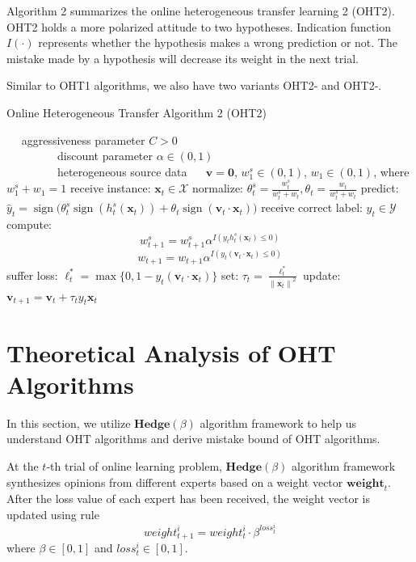 \documentclass{article} %
\theoremstyle{remark}
\theoremstyle{definition}
\DeclareMathOperator{\sign}{sign}
\begin{document}
Algorithm 2 summarizes the online heterogeneous transfer learning 2 (OHT2).
OHT2 holds a more polarized attitude to two hypotheses.
Indication function $I(\cdot)$ represents whether the hypothesis makes a wrong prediction or not.
The mistake made by a hypothesis will decrease its weight in the next trial.

Similar to OHT1 algorithms, we also have two variants OHT2-\uppercase\expandafter{} and OHT2-\uppercase\expandafter{}.

\begin{algorithm}
\begin{algorithmic}[1]
\caption{Online Heterogeneous Transfer Algorithm 2 (OHT2)}
\REQUIRE ~~
aggressiveness parameter $C>0$\\ 
~~~~~~~~~discount parameter $\alpha \in (0,1)$\\ 
~~~~~~~~~heterogeneous source data 
\ENSURE ~~
$\mathbf{v} = \mathbf{0}$, $w_{1}^{s} \in (0,1)$, $w_{1} \in (0,1)$, where $w_{1}^{s} + w_1 = 1$
\STATE 
  receive instance: $\mathbf{x}_t \in \mathcal{X}$
\STATE
  normalize: $\theta_{t}^{s} = \frac{w_{t}^{s}}{w_{t}^{s}+w_t}, \theta_{t} = \frac{w_{t}}{w_{t}^{s}+w_t}$
\STATE
  predict: $\hat{y}_t = \sign \big( \theta_{t}^{s} \sign (h_{t}^{s}(\mathbf{x}_t)) + \theta_{t} \sign (\mathbf{v}_t \cdot \mathbf{x}_t) \big)$
\STATE
  receive correct label: $y_t \in \mathcal{Y}$
\STATE
  compute: 
    $$w_{t+1}^{s} = w_{t+1}^{s} \alpha ^ {I(y_t h_{t}^{s}(\mathbf{x}_t) \leq 0)}  $$
    $$w_{t+1} = w_{t+1} \alpha ^ {I(y_t (\mathbf{v}_t \cdot \mathbf{x}_t) \leq 0)}  $$
\STATE
  suffer loss: $\ell_{t}^{*} = \max \{0, 1-y_t(\mathbf{v}_t \cdot \mathbf{x}_t)\}$
\STATE
  set: $\tau_t = \frac{\ell_{t}^{*}}{{\|\mathbf{x}_t\|}^2}$
\STATE
  update: $ \mathbf{v}_{t+1} = \mathbf{v}_t + \tau_t y_t \mathbf{x}_t $
\ENDFOR
\end{algorithmic}
\end{algorithm}


\section{Theoretical Analysis of OHT Algorithms}
In this section, we utilize $\mathbf{Hedge}(\beta)$ algorithm framework to help us understand OHT algorithms and derive mistake bound of OHT algorithms.

At the $t$-th trial of online learning problem, $\mathbf{Hedge}(\beta)$ algorithm framework synthesizes opinions from different experts based on a weight vector $\mathbf{weight}_t$.
After the loss value of each expert has been received, the weight vector is updated using rule
$$ weight_{t+1}^{i} = weight_{t}^{i} \cdot \beta^{loss_{t}^{i}} $$
where $\beta \in [0,1]$ and $loss_{t}^{i} \in [0,1]$.
\end{document}
